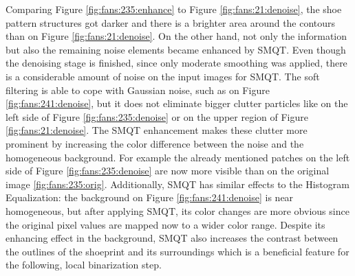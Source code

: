 \documentclass[draft,final]{vutinfth} %
\begin{document}
Comparing Figure \ref{fig:fans:235:enhance} to Figure \ref{fig:fans:21:denoise}, the shoe pattern structures got darker and there is a brighter area around the contours than on Figure \ref{fig:fans:21:denoise}.
On the other hand, not only the information but also the remaining noise elements became enhanced by SMQT.
Even though the denoising stage is finished, since only moderate smoothing was applied, there is a considerable amount of noise on the input images for SMQT.
The soft filtering is able to cope with Gaussian noise, such as on Figure \ref{fig:fans:241:denoise}, but it does not eliminate bigger clutter particles like on the left side of Figure \ref{fig:fans:235:denoise} or on the upper region of Figure \ref{fig:fans:21:denoise}.
The SMQT enhancement makes these clutter more prominent by increasing the color difference between the noise and the homogeneous background.
For example the already mentioned patches on the left side of Figure \ref{fig:fans:235:denoise} are now more visible than on the original image \ref{fig:fans:235:orig}.
Additionally, SMQT has similar effects to the Histogram Equalization: the background on Figure \ref{fig:fans:241:denoise} is near homogeneous, but after applying SMQT, its color changes are more obvious since the original pixel values are mapped now to a wider color range.
Despite its enhancing effect in the background, SMQT also increases the contrast between the outlines of the shoeprint and its surroundings which is a beneficial feature for the following, local binarization step.
\end{document}
